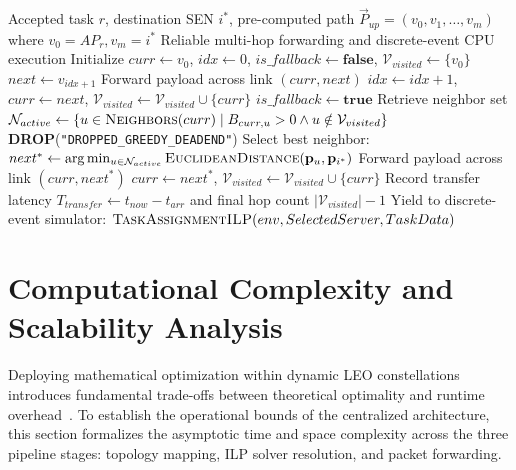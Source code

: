 \begin{algorithm}[H]
\caption{Dynamic Hybrid Routing and Task Execution}
\label{alg:hybrid_routing}
\small
\begin{algorithmic}[1]
\Require Accepted task $r$, destination SEN $i^*$, pre-computed path $\vec{P}_{up} = (v_0, v_1, \dots, v_m)$ where $v_0 = AP_r, v_m = i^*$
\Ensure Reliable multi-hop forwarding and discrete-event CPU execution
\State Initialize $curr \gets v_0$, $idx \gets 0$, $is\_fallback \gets \mathbf{false}$, $\mathcal{V}_{visited} \gets \{v_0\}$
     
        \State $next \gets v_{idx+1}$
            \State Forward payload across link $(curr, next)$
            \State $idx \gets idx + 1$, \quad $curr \gets next$, \quad $\mathcal{V}_{visited} \gets \mathcal{V}_{visited} \cup \{curr\}$
        \Else
            \State $is\_fallback \gets \mathbf{true}$ 
        \EndIf
    \EndIf
     
        \State Retrieve neighbor set $\mathcal{N}_{active} \gets \{u \in \Call{Neighbors}{curr} \mid B_{curr, u} > 0 \land u \notin \mathcal{V}_{visited}\}$
            \State \Return \textbf{DROP}(\texttt{"DROPPED\_GREEDY\_DEADEND"})
        \EndIf
        \State Select best neighbor: $next^* \gets \arg\min_{u \in \mathcal{N}_{active}} \Call{EuclideanDistance}{\mathbf{p}_u, \mathbf{p}_{i^*}}$
        \State Forward payload across link $(curr, next^*)$
        \State $curr \gets next^*$, \quad $\mathcal{V}_{visited} \gets \mathcal{V}_{visited} \cup \{curr\}$
    \EndIf
\EndWhile
\State Record transfer latency $T_{transfer} \gets t_{now} - t_{arr}$ and final hop count $|\mathcal{V}_{visited}| - 1$
\State Yield to discrete-event simulator: $\Call{TaskAssignmentILP}{env, SelectedServer, TaskData}$
\end{algorithmic}
\end{algorithm}
\FloatBarrier
\section{Computational Complexity and Scalability Analysis}
\label{sec:complexity_analysis}

Deploying mathematical optimization within dynamic LEO constellations introduces fundamental trade-offs between theoretical optimality and runtime overhead~\cite{icdcs_satellite_2025}. 
To establish the operational bounds of the centralized architecture, this section formalizes the asymptotic time and space complexity across the three pipeline stages: topology mapping, ILP solver resolution, and packet forwarding.

